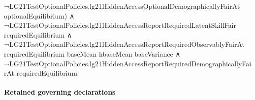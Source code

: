 \documentclass[10pt]{article}
\begin{document}
\begin{ReviewVerbatim}
                                  ¬LG21TestOptionalPolicies.lg21HiddenAccessOptionalDemographicallyFairAt
                                      optionalEquilibrium) ∧
                              ¬LG21TestOptionalPolicies.lg21HiddenAccessReportRequiredLatentSkillFair
                                    requiredEquilibrium ∧
                                ¬LG21TestOptionalPolicies.lg21HiddenAccessReportRequiredObservablyFairAt
                                      requiredEquilibrium baseMean hbaseMean baseVariance ∧
                                  ¬LG21TestOptionalPolicies.lg21HiddenAccessReportRequiredDemographicallyFairAt
                                      requiredEquilibrium
\end{ReviewVerbatim}

\paragraph{Retained governing declarations}
\end{document}
